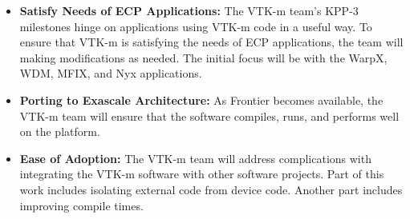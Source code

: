 \begin{itemize}
\item \textbf{Satisfy Needs of ECP Applications:}
  The VTK-m team's KPP-3 milestones hinge on applications using VTK-m code in a useful way.
  To ensure that VTK-m is satisfying the needs of ECP applications, the team will making modifications as needed.
  The initial focus will be with the WarpX, WDM, MFIX, and Nyx applications.
\item \textbf{Porting to Exascale Architecture:}
  As Frontier becomes available, the VTK-m team will ensure that the software compiles, runs, and performs well on the platform.
\item \textbf{Ease of Adoption:}
  The VTK-m team will address complications with integrating the VTK-m software with other software projects.
  Part of this work includes isolating external code from device code.
  Another part includes improving compile times.
\end{itemize}
